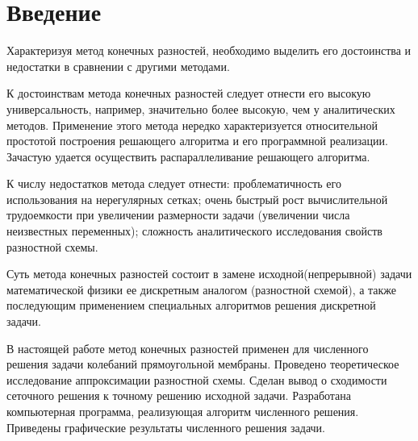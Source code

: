 \section*{Введение}
{
	Характеризуя метод конечных разностей, необходимо выделить его достоинства и недостатки в сравнении с другими методами.

	К достоинствам метода конечных разностей следует отнести его
высокую универсальность, например, значительно более высокую, чем у
аналитических методов. Применение этого метода нередко характеризуется
относительной простотой построения решающего алгоритма и его
программной реализации. Зачастую удается осуществить распараллеливание
решающего алгоритма.

	К числу недостатков метода следует отнести: проблематичность его
использования на нерегулярных сетках; очень быстрый рост вычислительной
трудоемкости при увеличении размерности задачи (увеличении числа
неизвестных переменных); сложность аналитического исследования свойств
разностной схемы.

	Суть метода конечных разностей состоит в замене
исходной(непрерывной) задачи математической физики ее дискретным
аналогом (разностной схемой), а также последующим применением
специальных алгоритмов решения дискретной задачи.

	В настоящей работе метод конечных разностей применен для
численного решения задачи колебаний прямоугольной мембраны. Проведено теоретическое
исследование аппроксимации разностной схемы. Сделан вывод
о сходимости сеточного решения к точному решению исходной задачи.
Разработана компьютерная программа, реализующая алгоритм численного решения. 
Приведены графические результаты численного решения задачи.
}
\newpage

\titleformat{\section}{\large\bfseries}{\thesection}{0.5em}{}
\titlespacing*{\section}{\parindent}{1ex}{1em}

